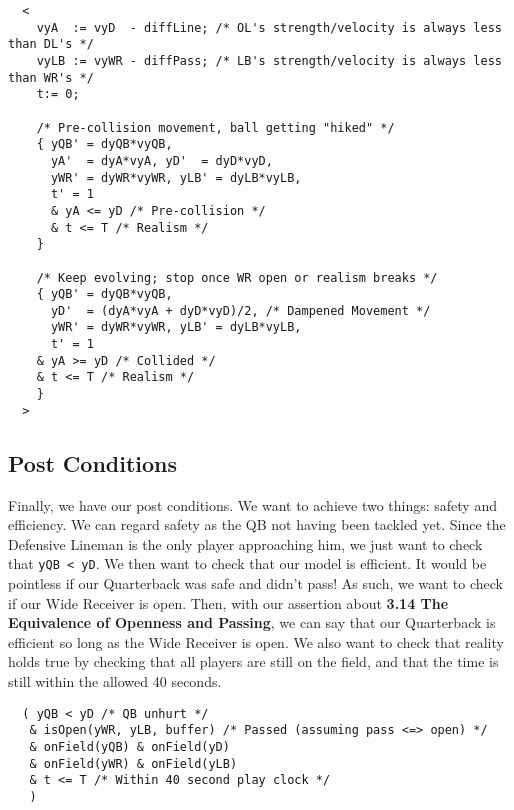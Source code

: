 \begin{lstlisting}
  <
    vyA  := vyD  - diffLine; /* OL's strength/velocity is always less than DL's */
    vyLB := vyWR - diffPass; /* LB's strength/velocity is always less than WR's */
    t:= 0;

    /* Pre-collision movement, ball getting "hiked" */
    { yQB' = dyQB*vyQB,
      yA'  = dyA*vyA, yD'  = dyD*vyD,
      yWR' = dyWR*vyWR, yLB' = dyLB*vyLB,
      t' = 1
      & yA <= yD /* Pre-collision */
      & t <= T /* Realism */
    }

    /* Keep evolving; stop once WR open or realism breaks */
    { yQB' = dyQB*vyQB,
      yD'  = (dyA*vyA + dyD*vyD)/2, /* Dampened Movement */
      yWR' = dyWR*vyWR, yLB' = dyLB*vyLB,
      t' = 1
    & yA >= yD /* Collided */
    & t <= T /* Realism */
    }
  >
\end{lstlisting}

\subsection{Post Conditions}

\quad Finally, we have our post conditions. We want to achieve two things: safety and efficiency. We can regard safety as the QB not having been tackled yet. Since the Defensive Lineman  is the only player approaching him, we just want to check that \texttt{yQB < yD}. We then want to check that our model is efficient. It would be pointless if our Quarterback was safe and didn't pass! As such, we want to check if our Wide Receiver is open. Then, with our assertion about \textbf{3.14 The Equivalence of Openness and Passing}, we can say that our Quarterback is efficient so long as the Wide Receiver is open. We also want to check that reality holds true by checking that all players are still on the field, and that the time is still within the allowed 40 seconds.

\begin{lstlisting}
  ( yQB < yD /* QB unhurt */
   & isOpen(yWR, yLB, buffer) /* Passed (assuming pass <=> open) */
   & onField(yQB) & onField(yD)
   & onField(yWR) & onField(yLB)
   & t <= T /* Within 40 second play clock */
   )
\end{lstlisting}